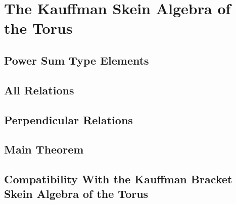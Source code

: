 \chapter{The Kauffman Skein Algebra of the Torus}

\section{Power Sum Type Elements}

\section{All Relations}

\section{Perpendicular Relations}

\section{Main Theorem}

\section{Compatibility With the Kauffman Bracket Skein Algebra of the Torus}